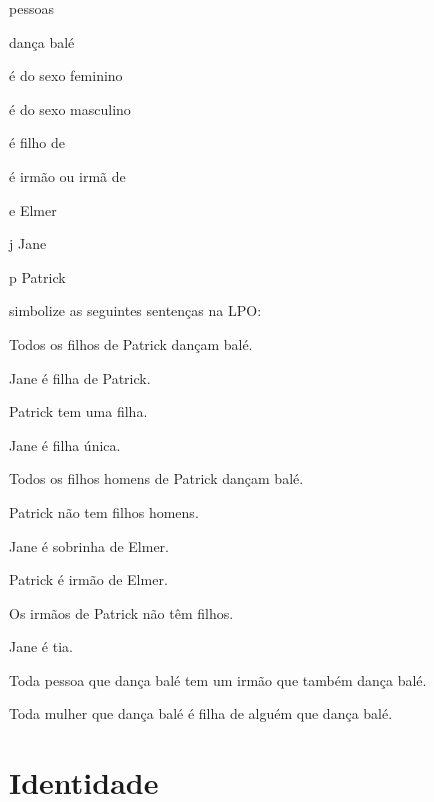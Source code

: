 \begin{ekey}
\item[\text{domínio}] pessoas
\item[\atom{D}{x}]  dança balé
\item[\atom{F}{x}]  é do sexo feminino
\item[\atom{M}{x}]  é do sexo masculino
\item[\atom{C}{x,y}]  é filho de 
\item[\atom{S}{x,y}]  é irmão ou irmã de 
\item[e] Elmer
\item[j] Jane
\item[p] Patrick
\end{ekey}
simbolize as seguintes sentenças na LPO:
\begin{compactlist}
\item Todos os filhos de Patrick dançam balé.
\item Jane é filha de Patrick.
\item Patrick tem uma filha.
\item Jane é filha única.
\item Todos os filhos homens de Patrick dançam balé.
\item Patrick não tem filhos homens.
\item Jane é sobrinha de Elmer.
\item Patrick é irmão de Elmer.
\item Os irmãos de Patrick não têm filhos.
\item Jane é tia.
\item Toda pessoa que dança balé tem um irmão que também dança balé.
\item Toda mulher que dança balé é filha de alguém que dança balé.
\end{compactlist}


\chapter{Identidade}
\label{sec.identity}

